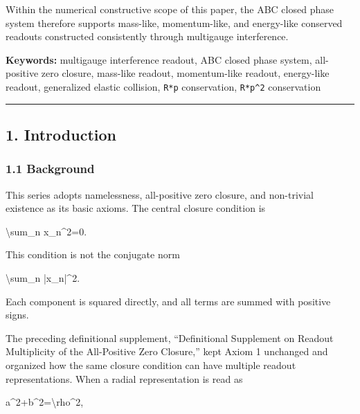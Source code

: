 \documentclass[
  a4paper,
]{article}
\newenvironment{Shaded}{}{}
\newcommand{\NormalTok}[1]{#1}
\begin{document}
Within the numerical constructive scope of this paper, the ABC closed
phase system therefore supports mass-like, momentum-like, and
energy-like conserved readouts constructed consistently through
multigauge interference.

\textbf{Keywords:} multigauge interference readout, ABC closed phase
system, all-positive zero closure, mass-like readout, momentum-like
readout, energy-like readout, generalized elastic collision,
\texttt{R*p} conservation, \texttt{R*p\^{}2} conservation

\begin{center}\rule{0.5\linewidth}{0.5pt}\end{center}

\subsection{1. Introduction}\label{introduction}

\subsubsection{1.1 Background}\label{background}

This series adopts namelessness, all-positive zero closure, and
non-trivial existence as its basic axioms. The central closure condition
is

\begin{Shaded}
\begin{Highlighting}[]
\NormalTok{\textbackslash{}sum\_n x\_n\^{}2=0.}
\end{Highlighting}
\end{Shaded}

This condition is not the conjugate norm

\begin{Shaded}
\begin{Highlighting}[]
\NormalTok{\textbackslash{}sum\_n |x\_n|\^{}2.}
\end{Highlighting}
\end{Shaded}

Each component is squared directly, and all terms are summed with
positive signs.

The preceding definitional supplement, ``Definitional Supplement on
Readout Multiplicity of the All-Positive Zero Closure,'' kept Axiom 1
unchanged and organized how the same closure condition can have multiple
readout representations. When a radial representation is read as

\begin{Shaded}
\begin{Highlighting}[]
\NormalTok{a\^{}2+b\^{}2=\textbackslash{}rho\^{}2,}
\end{Highlighting}
\end{Shaded}
\end{document}

